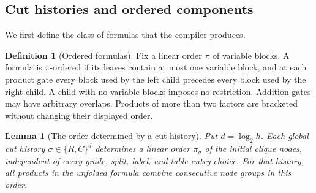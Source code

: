 \documentclass[11pt]{article}
\newtheorem{lemma}[theorem]{Lemma}
\theoremstyle{definition}
\newtheorem{definition}[theorem]{Definition}
\theoremstyle{remark}
\begin{document}
\subsection{Cut histories and ordered components}

We first define the class of formulas that the compiler produces.

\begin{definition}[Ordered formulas]
\label{def:ordered-formula}
Fix a linear order $\pi$ of variable blocks. A formula is $\pi$-ordered
if its leaves contain at most one variable block, and at each product
gate every block used by the left child precedes every block used by the
right child. A child with no variable blocks imposes no restriction.
Addition gates may have arbitrary overlaps. Products of more than two
factors are bracketed without changing their displayed order.
\end{definition}

\begin{lemma}[The order determined by a cut history]
\label{lem:cut-history-order}
Put $d=\log_2 h$. Each global cut history
$\sigma\in\{R,C\}^d$ determines a linear order $\pi_\sigma$ of the
initial clique nodes, independent of every grade, split, label, and
table-entry choice. For that history, all products in the unfolded
formula combine consecutive node groups in this order.
\end{lemma}
\end{document}
